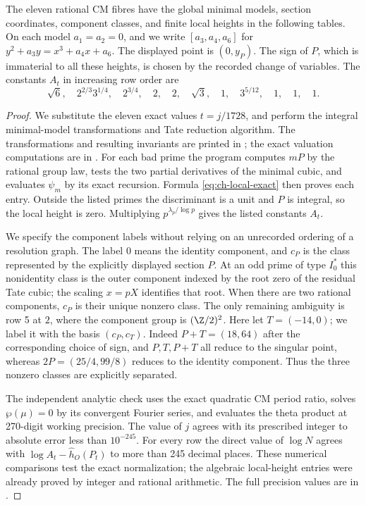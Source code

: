 \begin{statement}
The eleven rational CM fibres have the global minimal models,
section coordinates, component classes, and finite local heights
in the following tables. On each model $a_1=a_2=0$, and we
write $[a_3,a_4,a_6]$ for
$y^2+a_3y=x^3+a_4x+a_6$. The displayed point is $(0,y_P)$.
The sign of $P$, which is immaterial to all these heights,
is chosen by the recorded change of variables.
The constants $A_t$ in increasing row order are
\[
 \sqrt6,\quad 2^{2/3}3^{1/4},\quad 2^{3/4},\quad
 2,\quad 2,\quad \sqrt3,\quad 1,\quad 3^{5/12},\quad
 1,\quad1,\quad1.
\]
\end{statement}
\begin{proof}
We substitute the eleven exact values $t=j/1728$, and perform
the integral minimal-model transformations and Tate reduction
algorithm. The transformations and resulting invariants are
printed in ; the exact valuation
computations are in .
For each bad prime the program computes $mP$ by the rational
group law, tests the two partial derivatives of the minimal
cubic, and evaluates $\psi_m$ by its exact recursion. Formula
\eqref{eq:ch-local-exact} then proves each entry. Outside the
listed primes the discriminant is a unit and $P$ is integral,
so the local height is zero. Multiplying $p^{\lambda_p/\log p}$
gives the listed constants $A_t$.

We specify the component labels without relying on an
unrecorded ordering of a resolution graph. The label $0$
means the identity component, and $c_P$ is the class represented
by the explicitly displayed section $P$. At an odd prime of
type $I_0^*$ this nonidentity class is the outer component
indexed by the root zero of the residual Tate cubic; the
scaling $x=pX$ identifies that root. When there are two
rational components, $c_P$ is their unique nonzero class.
The only remaining ambiguity is row 5 at $2$, where the
component group is $(\Z/2)^2$. Here let $T=(-14,0)$;
we label it with the basis $(c_P,c_T)$. Indeed
$P+T=(18,64)$ after the corresponding choice of sign,
and $P,T,P+T$ all reduce to the singular point, whereas
$2P=(25/4,99/8)$ reduces to the identity component.
Thus the three nonzero classes are explicitly separated.

The independent analytic check uses the exact quadratic CM
period ratio, solves $\wp(\mu)=0$ by its convergent Fourier
series, and evaluates the theta product at 270-digit working
precision. The value of $j$ agrees with its prescribed integer
to absolute error less than $10^{-245}$. For every row the
direct value of $\log N$ agrees with
$\log A_t-\widehat h_O(P_t)$ to more than 245 decimal places.
These numerical comparisons test the exact normalization;
the algebraic local-height entries were already proved by
integer and rational arithmetic. The full precision values
are in .
\end{proof}
